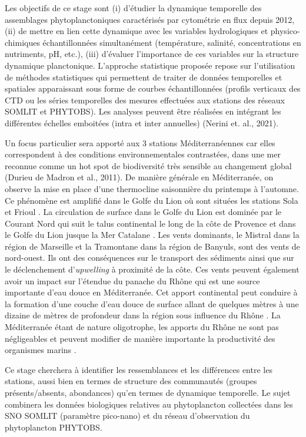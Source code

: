 \documentclass[12pt]{article}
\begin{document}
Les objectifs de ce stage sont (i) d’étudier la dynamique temporelle des assemblages phytoplanctoniques caractérisés par cytométrie en flux depuis 2012, (ii) de mettre en lien cette dynamique avec les variables hydrologiques et physico-chimiques échantillonnées simultanément (température, salinité, concentrations en nutriments, pH, etc.), (iii) d’évaluer l’importance de ces variables sur la structure dynamique planctonique. L’approche statistique proposée repose sur l’utilisation de méthodes statistiques qui permettent de traiter de données temporelles et spatiales apparaissant sous forme de courbes échantillonnées (profils verticaux des CTD ou les séries temporelles des mesures effectuées aux stations des réseaux SOMLIT et PHYTOBS). Les analyses peuvent être réalisées en intégrant les différentes échelles emboitées (intra et inter annuelles) (Nerini et. al., 2021).

Un focus particulier sera apporté aux 3 stations Méditerranéennes car elles correspondent à des conditions environnementales contrastées, dans une mer reconnue comme un hot spot de biodiversité très sensible au changement global (Durieu de Madron et al., 2011). De manière générale en Méditerranée, on observe la mise en place d’une thermocline saisonnière du printemps à l’automne. Ce phénomène est amplifié dans le Golfe du Lion où sont situées les stations Sola et Frioul \citep{Millot1990}. La circulation de surface dans le Golfe du Lion est dominée par le Courant Nord qui suit le talus continental le long de la côte de Provence et dans le Golfe du Lion jusque la Mer Catalane \citep{Millot1990}. Les vents dominants, le Mistral dans la région de Marseille et la Tramontane dans la région de Banyuls, sont des vents de nord-ouest.  Ils ont des conséquences sur le transport des sédiments ainsi que sur le déclenchement d’\textit{upwelling} à proximité de la côte. Ces vents peuvent également avoir un impact sur l’étendue du panache du Rhône qui est une source importante d’eau douce en Méditerranée. Cet apport continental peut conduire à la formation d’une couche d’eau douce de surface allant de quelques mètres à une dizaine de mètres de profondeur dans la région sous influence du Rhône \citep{Pairaud2011}. La Méditerranée étant de nature oligotrophe, les apports du Rhône ne sont pas négligeables et peuvent modifier de manière importante la productivité des organismes marins \citep{Pairaud2011}. 

Ce stage cherchera à identifier les ressemblances et les différences entre les stations, aussi bien en termes de structure des communautés (groupes présents/absents, abondances) qu’en termes de dynamique temporelle. Le sujet combinera les données biologiques relatives au phytoplancton collectées dans les SNO SOMLIT (paramètre pico-nano) et du réseau d'observation du phytoplancton PHYTOBS.
\end{document}

